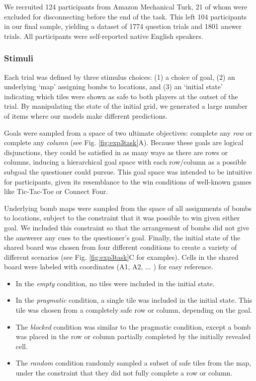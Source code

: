 \documentclass[11pt, floatsintext]{apa6}
\begin{document}
We recruited 124 participants from Amazon Mechanical Turk, 21 of whom were excluded for disconnecting before the end of the task. 
This left 104 participants in our final sample, yielding a dataset of 1774 question trials and 1801 answer trials. 
All participants were self-reported native English speakers.

\subsubsection{Stimuli}

Each trial was defined by three stimulus choices: (1) a choice of goal, (2) an underlying `map' assigning bombs to locations, and (3) an `initial state' indicating which tiles were shown as safe to both players at the outset of the trial.
By manipulating the state of the initial grid, we generated a large number of items where our models make different predictions. 

Goals were sampled from a space of two ultimate objectives: complete any \emph{row} or complete any \emph{column} (see Fig. \ref{fig:exp3task}A).
Because these goals are logical disjunctions, they could be satisfied in as many ways as there are rows or columns, inducing a hierarchical goal space with each row/column as a possible subgoal the questioner could pursue.
This goal space was intended to be intuitive for participants, given its resemblance to the win conditions of well-known games like Tic-Tac-Toe or Connect Four.

Underlying bomb maps were sampled from the space of all assignments of bombs to locations,  subject to the constraint that it was possible to win given either goal. 
We included this constraint so that the arrangement of bombs did not give the answerer any cues to the questioner's goal.
Finally, the initial state of the shared board was chosen from four different conditions to create a variety of different scenarios (see Fig. \ref{fig:exp3task}C for examples).
Cells in the shared board were labeled with coordinates (A1, A2, $\dots$ ) for easy reference.
\begin{itemize}
\item In the \emph{empty} condition, no tiles were included in the initial state.
\item In the \emph{pragmatic} condition, a single tile was included in the initial state. This tile was chosen from a completely safe row or column, depending on the goal.%
\item The \emph{blocked} condition was similar to the pragmatic condition, except a bomb was placed in the row or column partially completed by the initially revealed cell. %
\item The \emph{random} condition randomly sampled a subset of safe tiles from the map, under the constraint that they did not fully complete a row or column. 
\end{itemize}
\end{document}
